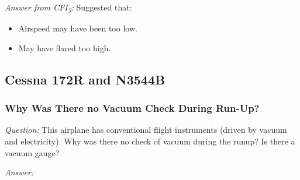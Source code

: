 \documentclass[letterpaper,10pt,titlepage]{article}
\begin{document}
\noindent{}\emph{Answer from CFI\textsubscript{3}:}  Suggested that:
\begin{itemize}
\item Airspeed may have been too low.
\item May have flared too high.
\end{itemize}


\subsection{Cessna 172R and N3544B}
\label{sqsa0:sc7r0}


\subsubsection{Why Was There no Vacuum Check During Run-Up?}
\label{sqsa0:sc7r0:slhy0}

\emph{Question:} This airplane has conventional flight instruments (driven by
vacuum and electricity).  Why was there no check of vacuum during the runup?  Is
there a vacuum gauge?

\noindent{}\emph{Answer:}


%
%
\clearpage
{}
\printindex
\end{document}
